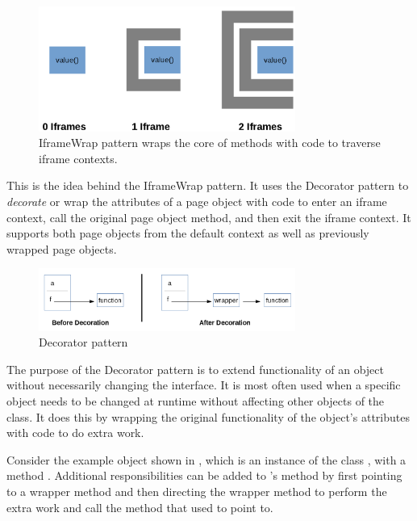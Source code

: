 \begin{figure}[tbh]
  \centering
  \includegraphics[width=0.75\textwidth]
    {../../images/iframewrap_pattern_multiple_frames.png}
  \caption{IframeWrap pattern wraps the core of methods with code to %
           traverse iframe contexts.}
  \label{fig:iframewrap_pattern_multiple_frames}
\end{figure}


This is the idea behind the IframeWrap pattern. It uses the Decorator pattern
to \textit{decorate} or wrap the attributes of a page object with code to enter
an iframe context, call the original page object method, and then exit the
iframe context. It supports both page objects from the default context as well
as previously wrapped page objects.


\begin{figure}[tbh]
  \centering
  \includegraphics[width=0.75\textwidth]
    {../../images/decorator_pattern_before_after.png}
  \caption{Decorator pattern}
  \label{fig:decorator_pattern}
\end{figure}


The purpose of the Decorator pattern is to extend functionality of an object
without necessarily changing the interface. It is most often used when a
specific object needs to be changed at runtime without affecting other objects
of the class.  It does this by wrapping the original functionality of the
object's attributes with code to do extra work.

Consider the example object  shown in ,
which is an instance of the class , with a method .
Additional responsibilities can be added to 's method 
by first pointing  to a wrapper method and then directing the
wrapper method to perform the extra work and call the method that
 used to point to.

